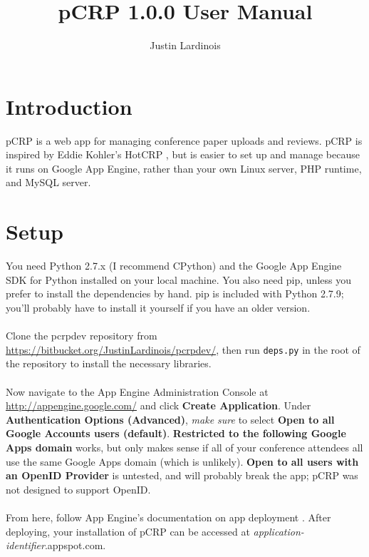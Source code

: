 \documentclass[12pt]{article}
\title{pCRP 1.0.0 User Manual}
\author{Justin Lardinois}
\date{}
\begin{document}
\maketitle

\section{Introduction}
	pCRP is a web app for managing conference paper uploads and reviews.
	pCRP is inspired by Eddie Kohler's HotCRP \cite{kohler}, but is easier
	to set up and manage because it runs on Google App Engine, rather than
	your own Linux server, PHP runtime, and MySQL server.

\section{Setup}
	You need Python 2.7.x (I recommend CPython) and the Google App Engine
	SDK for Python \cite{gaesdk} installed on your local machine. You also
	need pip, unless you prefer to install the dependencies by hand. pip
	is included with Python 2.7.9; you'll probably have to install it
	yourself if you have an older version.
	\\\\
	Clone the pcrpdev repository from
	\url{https://bitbucket.org/JustinLardinois/pcrpdev/}, then run
	\texttt{deps.py} in the root of the repository to install the
	necessary libraries.
	\\\\
	Now navigate to the App Engine Administration Console at
	\url{http://appengine.google.com/} and click \textbf{Create Application}.
	Under \textbf{Authentication Options (Advanced)}, \textit{make sure}
	to select \textbf{Open to all Google Accounts users (default)}.
	\textbf{Restricted to the following Google Apps domain} works,
	but only makes sense if all of your conference attendees all use
	the same Google Apps domain (which is unlikely).
	\textbf{Open to all users with an OpenID Provider} is untested,
	and will probably break the app; pCRP was not designed to
	support OpenID.
	\\\\
	From here, follow App Engine's documentation on app deployment
	\cite{deploy}. After deploying, your installation of pCRP can
	be accessed at \textit{application-identifier}.appspot.com.
\end{document}
